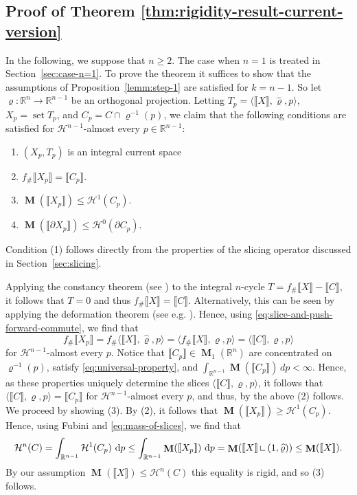 \documentclass[reqno]{amsart}
\numberwithin{equation}{section}
\newcommand{\R}{\mathbb{R}}
\newcommand{\Ha}{\mathcal{H}}
\newcommand{\on}{\:\mbox{\rule{0.1ex}{1.2ex}\rule{1.1ex}{0.1ex}}\:}
\newcommand{\bb}[1]{\llbracket #1\rrbracket}
\DeclareMathOperator{\mass}{\mathbf{M}}
\DeclareMathOperator{\set}{set}
\renewcommand{\rho}{\varrho}
\begin{document}
\subsection{Proof of Theorem \ref{thm:rigidity-result-current-version}}\label{sec:proof-of-main-thm}
In the following, we suppose that \(n\geq 2\). The case when \(n=1\) is treated in Section~\ref{sec:case-n=1}. To prove the theorem it suffices to show that the assumptions of Proposition~\ref{lemm:step-1} are satisfied for $k=n-1$. So let $\rho \colon \mathbb{R}^n\to \mathbb{R}^{n-1}$ be an orthogonal projection.
Letting $T_p=\langle \bb{X}, \widehat{\rho},p \rangle$, \(X_p= \set T_p\), and $C_p=C\cap \rho^{-1}(p)$, 
we claim that the following conditions are satisfied for \(\Ha^{n-1}\)-almost every $p\in\mathbb{R}^{n-1}$:
\begin{enumerate}
    \item \((X_p, T_p)\) is an integral current space
    \item $f_\# \bb{X_p}=  \bb{C_p}$. 
    \item $\mass(\bb{X_p})\leq \mathcal{H}^1(C_p)$.
    \item $\mass(\bb{\partial X_p})\leq \mathcal{H}^0(\partial C_p)$.
\end{enumerate}

Condition (1) follows directly from the properties of the slicing operator discussed in Section~\ref{sec:slicing}.

 Applying the constancy theorem (see \cite[Corollary 3.13]{fed60}) to the integral \(n\)-cycle \(T=f_\# \bb{X}-\bb{C}\), it follows that \(T=0\) and thus $f_\# \bb{X}=\bb{C}$. Alternatively, this can be seen by applying the deformation theorem (see e.g. \cite[Theorem A.2]{basso2021undistorted}). Hence, using \eqref{eq:slice-and-push-forward-commute}, we find that 
 \[
 f_\# \bb{X_p}=f_\# \langle \bb{X}, \widehat{\rho},p \rangle=\langle f_\# \bb{X}, \rho,p \rangle=\langle \bb{C}, \rho,p \rangle
 \]
 for \(\Ha^{n-1}\)-almost every $p$. Notice that \(\bb{C_p}\in \mass_1(\R^n)\) are concentrated on \(\rho^{-1}(p)\), satisfy \eqref{eq:universal-property}, and \(\int_{\R^{n-1}} \mass(\bb{C_p}) \, dp <\infty\). Hence, as these properties uniquely determine the slices \(\langle \bb{C}, \rho,p \rangle\), it follows that \(\langle \bb{C}, \rho,p \rangle=\bb{C_p}\) for \(\Ha^{n-1}\)-almost every $p$, and thus, by the above (2) follows. 
 We proceed by showing (3). By (2), it follows that $\mass(\bb{X_p})\geq \mathcal{H}^1(C_p)$. Hence, using Fubini and \eqref{eq:mass-of-slices}, we find that
\begin{align*}
    \mathcal{H}^n(C)=\int_{\R^{n-1}}\mathcal{H}^{1}(C_p) \ \mathrm{d}p\leq \int_{\R^{n-1}}\mass(\bb{X_p}) \ \mathrm{d}p =\mass(\bb{X} \on (1, \widehat{\rho}))\leq \mass(\bb{X}).
\end{align*}
By our assumption \(\mass(\bb{X})\leq \Ha^{n}(C)\) this equality is rigid, and so (3) follows.
\end{document}
